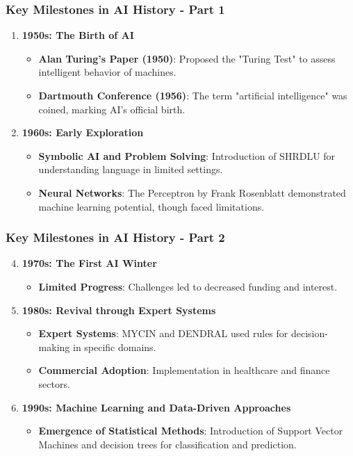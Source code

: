 \documentclass[aspectratio=169]{beamer}
\begin{document}
\begin{frame}[fragile]
    \frametitle{Key Milestones in AI History - Part 1}
    \begin{enumerate}
        \item \textbf{1950s: The Birth of AI}
            \begin{itemize}
                \item \textbf{Alan Turing's Paper (1950)}: Proposed the "Turing Test" to assess intelligent behavior of machines.
                \item \textbf{Dartmouth Conference (1956)}: The term "artificial intelligence" was coined, marking AI's official birth.
            \end{itemize}
        \item \textbf{1960s: Early Exploration}
            \begin{itemize}
                \item \textbf{Symbolic AI and Problem Solving}: Introduction of SHRDLU for understanding language in limited settings.
                \item \textbf{Neural Networks}: The Perceptron by Frank Rosenblatt demonstrated machine learning potential, though faced limitations.
            \end{itemize}
    \end{enumerate}
\end{frame}

\begin{frame}[fragile]
    \frametitle{Key Milestones in AI History - Part 2}
    \begin{enumerate}
        \setcounter{enumi}{3} %
        \item \textbf{1970s: The First AI Winter}
            \begin{itemize}
                \item \textbf{Limited Progress}: Challenges led to decreased funding and interest.
            \end{itemize}
        \item \textbf{1980s: Revival through Expert Systems}
            \begin{itemize}
                \item \textbf{Expert Systems}: MYCIN and DENDRAL used rules for decision-making in specific domains.
                \item \textbf{Commercial Adoption}: Implementation in healthcare and finance sectors.
            \end{itemize}
        \item \textbf{1990s: Machine Learning and Data-Driven Approaches}
            \begin{itemize}
                \item \textbf{Emergence of Statistical Methods}: Introduction of Support Vector Machines and decision trees for classification and prediction.
            \end{itemize}
    \end{enumerate}
\end{frame}
\end{document}
